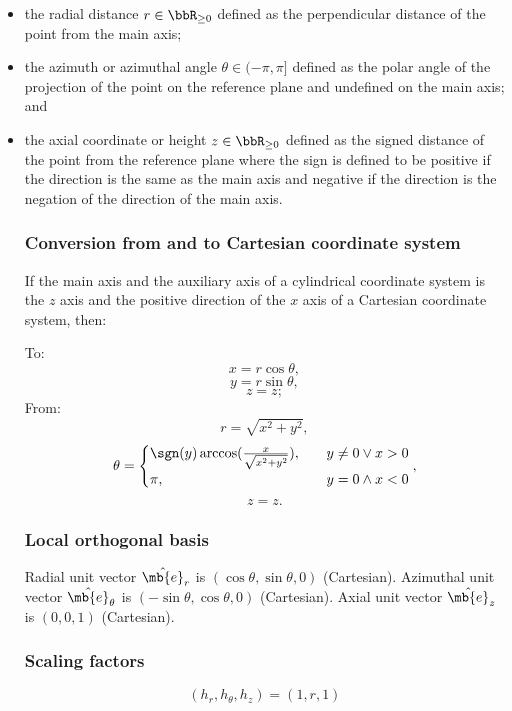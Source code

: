 \documentclass[a4paper,12pt]{report}
\begin{document}
\begin{itemize}
\begin{itemize}
\subsubsection{ISO 31-11 Definition}
A cylindrical coordinate system is a three-dimensional coordinate system that specifies point positions by a main axis (a chosen directed line) and an auxiliary axis (a reference ray) with the intersection of the two axes called the origin and the plane passing through the origin and perpendicular to the main axis equipped with polar coordinate system with the polar axis being the auxiliary axis called the reference plane. The three cylindrical coordinates $(r,\theta,z)$ are:
\bit
\item the radial distance $r\in\bbR_{\geq 0}$ defined as the perpendicular distance of the point from the main axis;
\item the azimuth or azimuthal angle $\theta\in(-\pi,\pi]$ defined as the polar angle of the projection of the point on the reference plane and undefined on the main axis; and
\item the axial coordinate or height $z\in\bbR_{\geq 0}$ defined as the signed distance of the point from the reference plane where the sign is defined to be positive if the direction is the same as the main axis and negative if the direction is the negation of the direction of the main axis.
\eit
\subsubsection{Conversion from and to Cartesian coordinate system}
If the main axis and the auxiliary axis of a cylindrical coordinate system is the $z$ axis and the positive direction of the $x$ axis of a Cartesian coordinate system, then:

To:
\[x=r\cos\theta,\]
\[y=r\sin\theta,\]
\[z=z;\]
From:
\[r=\sqrt{x^2+y^2},\]
\[\theta=\begin{cases}\sgn(y)\arccos(\frac{x}{\sqrt{x^2+y^2}}),\quad&y\neq 0\lor x>0\\\pi,\quad&y=0\land x<0\end{cases},\]
\[z=z.\]
\subsubsection{Local orthogonal basis}
Radial unit vector $\hat{\mb{e}}_r$ is $(\cos\theta,\sin\theta,0)$ (Cartesian). Azimuthal unit vector $\hat{\mb{e}}_{\theta}$ is $(-\sin\theta,\cos\theta,0)$ (Cartesian). Axial unit vector $\hat{\mb{e}}_z$ is $(0,0,1)$ (Cartesian).
\subsubsection{Scaling factors}
\[(h_r,h_{\theta},h_z)=(1,r,1)\]

\end{itemize}
\end{itemize}
\end{document}
